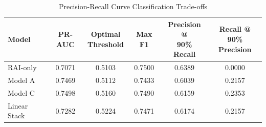 \begin{table}[htbp]
\centering
\small
\caption{Precision-Recall Curve Classification Trade-offs}
\label{tab:pr_curves}
\begin{tabular}{lccccc}
\hline\hline
Model & PR-AUC & \parbox{1.8cm}{\centering Optimal\\Threshold} & Max F1 & \parbox{2.2cm}{\centering Precision @\\90\% Recall} & \parbox{2.2cm}{\centering Recall @\\90\% Precision} \\
\hline
RAI-only & 0.7071 & 0.5103 & 0.7500 & 0.6389 & 0.0000 \\
Model A & 0.7469 & 0.5112 & 0.7433 & 0.6039 & 0.2157 \\
Model C & 0.7498 & 0.5160 & 0.7490 & 0.6159 & 0.2353 \\
Linear Stack & 0.7282 & 0.5224 & 0.7471 & 0.6174 & 0.2157 \\
\hline
\end{tabular}
\end{table}
